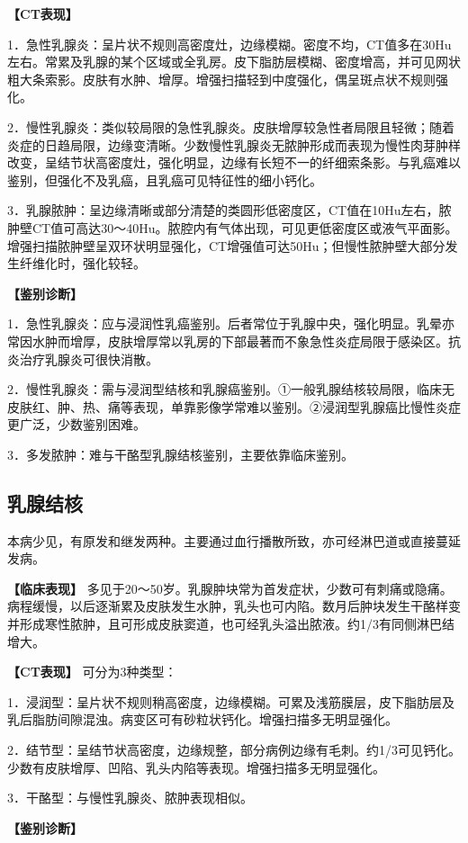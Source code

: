 \textbf{【CT表现】}

1．急性乳腺炎：呈片状不规则高密度灶，边缘模糊。密度不均，CT值多在30Hu左右。常累及乳腺的某个区域或全乳房。皮下脂肪层模糊、密度增高，并可见网状粗大条索影。皮肤有水肿、增厚。增强扫描轻到中度强化，偶呈斑点状不规则强化。

2．慢性乳腺炎：类似较局限的急性乳腺炎。皮肤增厚较急性者局限且轻微；随着炎症的日趋局限，边缘变清晰。少数慢性乳腺炎无脓肿形成而表现为慢性肉芽肿样改变，呈结节状高密度灶，强化明显，边缘有长短不一的纤细索条影。与乳癌难以鉴别，但强化不及乳癌，且乳癌可见特征性的细小钙化。

3．乳腺脓肿：呈边缘清晰或部分清楚的类圆形低密度区，CT值在10Hu左右，脓肿壁CT值可高达30～40Hu。脓腔内有气体出现，可见更低密度区或液气平面影。增强扫描脓肿壁呈双环状明显强化，CT增强值可达50Hu；但慢性脓肿壁大部分发生纤维化时，强化较轻。

\textbf{【鉴别诊断】}

1．急性乳腺炎：应与浸润性乳癌鉴别。后者常位于乳腺中央，强化明显。乳晕亦常因水肿而增厚，皮肤增厚常以乳房的下部最著而不象急性炎症局限于感染区。抗炎治疗乳腺炎可很快消散。

2．慢性乳腺炎：需与浸润型结核和乳腺癌鉴别。①一般乳腺结核较局限，临床无皮肤红、肿、热、痛等表现，单靠影像学常难以鉴别。②浸润型乳腺癌比慢性炎症更广泛，少数鉴别困难。

3．多发脓肿：难与干酪型乳腺结核鉴别，主要依靠临床鉴别。

\subsection{乳腺结核}

本病少见，有原发和继发两种。主要通过血行播散所致，亦可经淋巴道或直接蔓延发病。

\textbf{【临床表现】}
多见于20～50岁。乳腺肿块常为首发症状，少数可有刺痛或隐痛。病程缓慢，以后逐渐累及皮肤发生水肿，乳头也可内陷。数月后肿块发生干酪样变并形成寒性脓肿，且可形成皮肤窦道，也可经乳头溢出脓液。约1/3有同侧淋巴结增大。

\textbf{【CT表现】} 可分为3种类型：

1．浸润型：呈片状不规则稍高密度，边缘模糊。可累及浅筋膜层，皮下脂肪层及乳后脂肪间隙混浊。病变区可有砂粒状钙化。增强扫描多无明显强化。

2．结节型：呈结节状高密度，边缘规整，部分病例边缘有毛刺。约1/3可见钙化。少数有皮肤增厚、凹陷、乳头内陷等表现。增强扫描多无明显强化。

3．干酪型：与慢性乳腺炎、脓肿表现相似。

\textbf{【鉴别诊断】}

